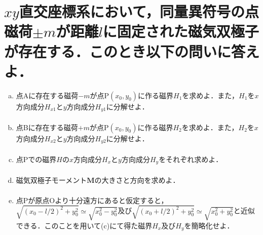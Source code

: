 \documentclass[dvipdfmx]{ujarticle}
\begin{document}
\section{$xy$直交座標系において，同量異符号の点磁荷$\pm m$が距離$l$に固定された磁気双極子が存在する．このとき以下の問いに答えよ．}
\begin{enumerate}[(a)]
	\item 点Aに存在する磁荷$-m$が点P$(x_0,y_0)$に作る磁界$H_{1}$を求めよ．また，$H_{1}$を$x$方向成分$H_{x1}$と$y$方向成分$H_{y1}$に分解せよ．
	\begin{align*}
	\end{align*}
	\item 点Bに存在する磁荷$+m$が点P$(x_0,y_0)$に作る磁界$H_{2}$を求めよ．また，$H_{2}$を$x$方向成分$H_{x2}$と$y$方向成分$H_{y2}$に分解せよ．
	\begin{align*}
	\end{align*}
	\item 点Pでの磁界$H$の$x$方向成分$H_{x}$と$y$方向成分$H_{y}$をそれぞれ求めよ．
	\begin{align*}
	\end{align*}
	\item 磁気双極子モーメント$\boldsymbol{M}$の大きさと方向を求めよ．
	\begin{align*}
	\end{align*}
	\item 点Pが原点Oより十分遠方にあると仮定すると，$\sqrt{(x_{0}-l/2)^{2}+y_{0}^{2}}\simeq \sqrt{x_{0}^{2}-y_{0}^{2}}$及び$\sqrt{(x_{0}+l/2)^{2}+y_{0}^{2}} \simeq \sqrt{x_{0}^{2}+y_{0}^{2}}$と近似できる．このことを用いて(c)にて得た磁界$H_{x}$及び$H_{y}$を簡略化せよ．

\end{enumerate}
\end{document}
